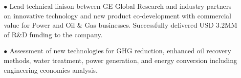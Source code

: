 \documentclass[10pt, letterpaper]{article}
\begin{document}
	\begin{itemize}
		\item[\tiny$\bullet$] Lead technical liaison between GE Global Research and industry partners on innovative technology and new product co-development with commercial value for Power and Oil \& Gas businesses. Successfully delivered {\textdollar}USD 3.2MM of R\&D funding to the company.
		
		\item[\tiny$\bullet$] Assessment of new technologies for GHG reduction, enhanced oil recovery methods, water treatment, power generation, and energy conversion including engineering economics analysis.
		
		
		
		
	\end{itemize}
\end{document}

